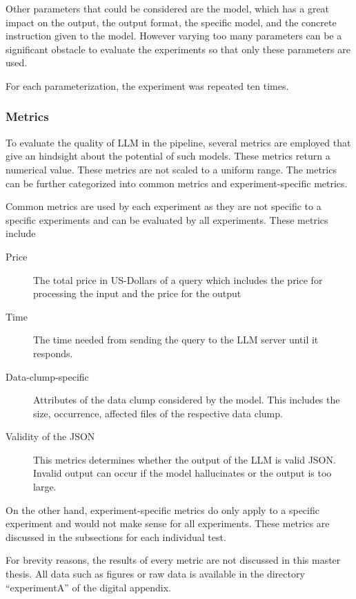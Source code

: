 Other parameters that could be considered are the model, which has a great impact on the output, the output format, the specific model, and the concrete instruction given to the model. However varying too many parameters can be a significant obstacle to evaluate the experiments so that only these parameters are used. 

For each parameterization, the experiment was repeated ten times. 



\subsubsection{Metrics}

To evaluate the quality of \ac{LLM} in the pipeline, several metrics are employed that give an hindsight about the potential of such models. These metrics return a numerical value. These metrics are not scaled to a uniform range. The metrics can be further categorized into common metrics and experiment-specific metrics. 

Common metrics are used by each experiment as they are not specific to a specific experiments and can be evaluated by all experiments. These metrics include
\begin{description}
    \item [Price] The total price in US-Dollars of a query which includes the price for processing the input and the price for the output
    \item [Time] The time needed from sending the query to the \ac{LLM} server until it responds. 
    \item[ Data-clump-specific] Attributes of the data clump considered by the model. This includes the size, occurrence, affected files of the respective data clump. 
    \item[Validity of the JSON] This metrics determines whether the output of the \ac{LLM} is valid \ac{JSON}. Invalid output can occur if the model hallucinates or the output is too large.
\end{description}


On the other hand, experiment-specific metrics do only apply to a specific experiment and would not make sense for all experiments. These metrics are discussed in the subsections for each individual test. 

For brevity reasons, the results of every metric are not discussed in this master thesis. All data such as figures or raw data is available in the directory \enquote{experimentA} of the digital appendix. 


